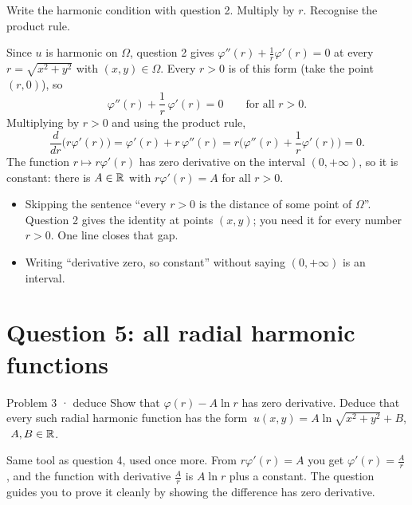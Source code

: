 \begin{howto}
Write the harmonic condition with question 2. Multiply by $r$. Recognise the product rule.
\end{howto}

\begin{answer}
Since $u$ is harmonic on $\Omega$, question 2 gives $\varphi''(r)+\frac1r\varphi'(r)=0$ at every
$r=\sqrt{x^2+y^2}$ with $(x,y)\in\Omega$. Every $r>0$ is of this form (take the point $(r,0)$), so
\[
  \varphi''(r)+\frac1r\,\varphi'(r)=0\qquad\text{for all }r>0 .
\]
Multiplying by $r>0$ and using the product rule,
\[
  \frac{d}{dr}\big(r\varphi'(r)\big)=\varphi'(r)+r\,\varphi''(r)=r\Big(\varphi''(r)+\frac1r\varphi'(r)\Big)=0 .
\]
The function $r\mapsto r\varphi'(r)$ has zero derivative on the interval $(0,+\infty)$, so it is
constant: there is $A\in\mathbb{R}$ with $r\varphi'(r)=A$ for all $r>0$.
\end{answer}

\begin{trap}
\begin{itemize}
  \item Skipping the sentence ``every $r>0$ is the distance of some point of $\Omega$''. Question 2 gives
        the identity at points $(x,y)$; you need it for every number $r>0$. One line closes that gap.
  \item Writing ``derivative zero, so constant'' without saying $(0,+\infty)$ is an interval.
\end{itemize}
\end{trap}

\section{Question 5: all radial harmonic functions}

\begin{question}{Problem 3 \;·\; deduce}
Show that $\varphi(r)-A\ln r$ has zero derivative. Deduce that every such radial harmonic function has
the form $\ u(x,y)=A\ln\sqrt{x^2+y^2}+B$, $\ A,B\in\mathbb{R}$.
\end{question}

\begin{lesson}
Same tool as question 4, used once more. From $r\varphi'(r)=A$ you get $\varphi'(r)=\frac Ar$, and the
function with derivative $\frac Ar$ is $A\ln r$ plus a constant. The question guides you to prove it
cleanly by showing the difference has zero derivative.
\end{lesson}

